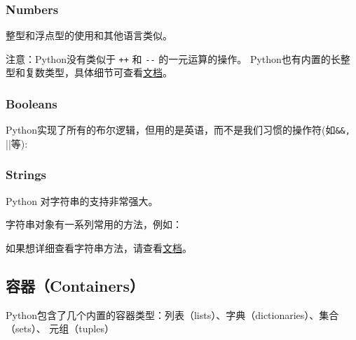 \subsubsection{Numbers}
整型和浮点型的使用和其他语言类似。



%

注意：Python没有类似于 \lstinline|++| 和 \lstinline|--| 的一元运算的操作。 Python也有内置的长整型和复数类型，具体细节可查看\href{https://docs.python.org/3.5/library/stdtypes.html#numeric-types-int-float-complex}{文档}。


%

\subsubsection{Booleans}
Python实现了所有的布尔逻辑，但用的是英语，而不是我们习惯的操作符(如\lstinline|&&, |||等):



%

\subsubsection{Strings}
Python 对字符串的支持非常强大。




字符串对象有一系列常用的方法，例如：



如果想详细查看字符串方法，请查看\href{https://docs.python.org/3.5/library/stdtypes.html#string-methods}{文档}。

\subsection{容器（Containers）}

Python包含了几个内置的容器类型：列表（lists）、字典（dictionaries）、集合（sets）、 元组（tuples）

